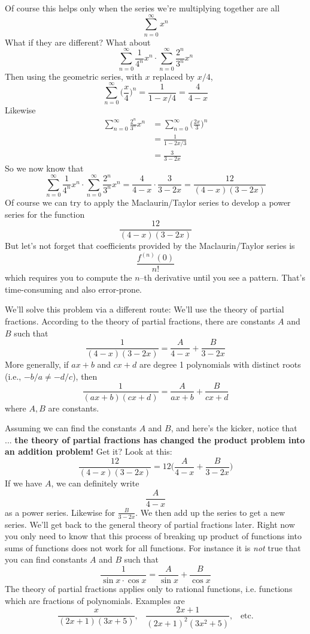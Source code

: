 \newpage
Of course this helps only when the series we're multiplying
together are all
\[
\sum_{n=0}^\infty x^n
\]
What if they are different?
What about 
\[
\sum_{n=0}^\infty \frac{1}{4^n} x^n 
\cdot 
\sum_{n=0}^\infty \frac{2^n}{3^n} x^n 
\]
Then using the geometric series, with $x$ replaced by $x/4$,
\[
\sum_{n=0}^\infty \biggl( \frac{x}{4} \biggr) ^n = \frac{1}{1-x/4}
= \frac{4}{4 - x}
\]
Likewise
\begin{align*}
\sum_{n=0}^\infty \frac{2^n}{3^n} x^n 
&= \sum_{n=0}^\infty \biggr( \frac{2x}{3} \biggl)^n \\
&= \frac{1}{1 - 2x/3} \\
&= \frac{3}{3 - 2x}
\end{align*}
So we now know that
\[
\sum_{n=0}^\infty \frac{1}{4^n} x^n 
\cdot 
\sum_{n=0}^\infty \frac{2^n}{3^n} x^n 
= \frac{4}{4 - x} \cdot  \frac{3}{3 - 2x}
= \frac{12}{(4-x)(3-2x)} 
\]
Of course we can try to 
apply the Maclaurin/Taylor series to develop a power series for the 
function
\[
\frac{12}{(4-x)(3-2x)} 
\]
But let's not forget that coefficients provided by the Maclaurin/Taylor
series is
\[
\frac{f^{(n)}(0)}{n!}
\]
which requires you to compute the $n$--th derivative until you see
a pattern.
That's time-consuming and also error-prone.

We'll solve this problem via a different route:
We'll use the theory of partial fractions.
According to the theory of partial fractions, there are constants $A$ and $B$ such that
\[
\frac{1}{(4-x)(3-2x)}
=
\frac{A}{4-x} +
\frac{B}{3-2x}
\]
More generally, if $ax + b$ and $cx + d$ are degree 1 polynomials with
distinct roots (i.e., $-b/a \neq -d/c$), then  
\[
\frac{1}{(ax+b)(cx+d)}
=
\frac{A}{ax+b} +
\frac{B}{cx+d}
\]
where $A,B$ are constants.

Assuming we can find the constants $A$ and $B$, and here's the
kicker, notice that ... \textbf{the theory of partial fractions has
changed the product problem into an addition problem!}
Get it? Look at this:
\[
\frac{12}{(4-x)(3-2x)} 
= 12 \biggl( 
\frac{A}{4-x} +
\frac{B}{3-2x}
\biggr)
\]
If we have $A$, we can definitely write 
\[
\frac{A}{4-x}
\]
as a power series.
Likewise for $\displaystyle \frac{B}{3-2x}$.
We then add up the series to get a new series.
We'll get back to the general theory of partial fractions later.
Right now you only need to know that 
this process of breaking up product of functions into sums of functions
does not work for all functions.
For instance it is \textit{not} true that you can find constants $A$ and $B$
such that
\[
\frac{1}{\sin x \cdot \cos x}
=
\frac{A}{\sin x} + 
\frac{B}{\cos x}
\]
The theory of partial fractions applies only to rational functions, 
i.e. functions which are fractions of polynomials.
Examples are
\[
\frac{x}{(2x + 1)(3x+5)}, \,\,\,\,\,
\frac{2x + 1}{(2x + 1)^2(3x^2+5)}, \,\,\,\,\,
\text{etc.}
\]


